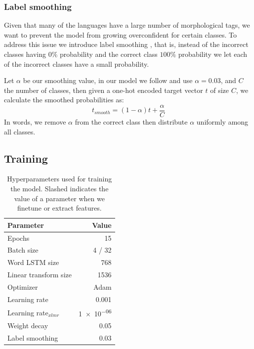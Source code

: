 \documentclass[11pt]{article}
\newcommand\citep{\cite}
\begin{document}
	\subsubsection{Label smoothing}
    	Given that many of the languages have a large number of
     morphological tags, we want to prevent the model from growing
     overconfident for certain classes. To address this issue we
     introduce label smoothing \cite{szegedy2016rethinking}, that is,
     instead of the incorrect classes having $0\%$ probability and the
     correct class $100\%$ probability we let each of the incorrect
     classes have a small probability.

         Let $\alpha$ be our smoothing value, in our model we follow
     \citep{kondratyukstraka} and use $\alpha = 0.03$, and $C$ the
     number of classes, then given a one-hot encoded target vector $t$
     of size $C$, we calculate the smoothed probabilities as:
    \begin{equation}
        t_{smooth} = (1-\alpha)t + \frac{\alpha}{C}
    \end{equation}
    In words, we remove $\alpha$ from the correct class then
    distribute $\alpha$ uniformly among all classes.


    \subsection{Training}

            \begin{table}
		\centering
		\begin{tabular}{lr} \\
			Parameter & Value \\
			\hline
			Epochs & 15 \\
			Batch size & 4 / 32 \\
            Word LSTM size & 768 \\
            Linear transform size & 1536 \\
			Optimizer & Adam \\
			Learning rate & 0.001 \\
			Learning rate$_{xlmr}$ & \num{1e-06} \\
            Weight decay & 0.05 \\
			Label smoothing & 0.03 \\
		\end{tabular}
    		\caption{\label{tab:parameters} Hyperparameters used for
     training the model. Slashed indicates the value of a parameter
     when we finetune or extract features.}
	\end{table}
    
\end{document}
